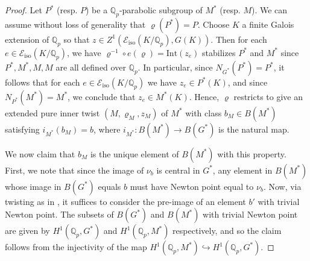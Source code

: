 \documentclass[reqno,11pt]{amsart}
\theoremstyle{remark}
\newcommand{\mc}{\mathcal}
\newcommand{\Q}{\mathbb{Q}}
\newcommand{\Int}{\mathrm{Int}}
\newcommand{\iso}{\mathrm{iso}}
\begin{document}
\begin{proof}
Let $P^*$ (resp. $P$) be a $\Q_p$-parabolic subgroup of $M^*$ (resp. $M$). We can assume without loss of generality that $\varrho(P^*) = P$. Choose $K$ a finite Galois extension of $\Q_p$ so that $z \in Z^1(\mc{E}_{\iso}(K/\Q_p), G(K))$. Then for each $e \in \mc{E}_{\iso}(K/\Q_p)$, we have $\varrho^{-1} \circ e(\varrho) = \Int(z_e)$ stabilizes $P^*$ and $M^*$ since $P^*, M^*, M, M$ are all defined over $\Q_p$. In particular, since $N_{G^*}(P^*) = P^*$, it follows that for each $e \in \mc{E}_{\iso}(K/\Q_p)$ we have $z_e \in P^*(K)$, and since $N_{P^*}(M^*)=M^*$, we conclude that $z_e \in M^*(K)$. Hence, $\varrho$ restricts to give an extended pure inner twist $(M, \varrho_M, z_M)$ of $M^*$ with class $b_M \in B(M^*)$ satisfying $i_{M^*}(b_M)=b$, where $i_{M^*}: B(M^*) \to B(G^*)$ is the natural map.

We now claim that $b_M$ is the unique element of $B(M^*)$ with this property. First, we note that since the image of $\nu_b$ is central in $G^*$, any element in $B(M^*)$ whose image in $B(G^*)$ equals $b$ must have Newton point equal to $\nu_b$. Now, via twisting as in \cite[\S3.4]{KottwitzIsocrystals2}, it suffices to consider the pre-image of an element $b'$ with trivial Newton point. The subsets of $B(G^*)$ and $B(M^*)$ with trivial Newton point are given by $H^1(\Q_p, G^*)$ and $H^1(\Q_p, M^*)$ respectively, and so the claim follows from the injectivity of the map $H^1(\Q_p, M^*) \hookrightarrow H^1(\Q_p, G^*)$.
\end{proof}
\end{document}
